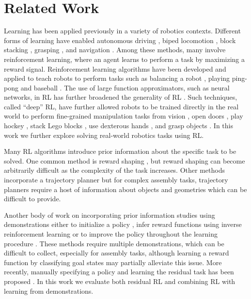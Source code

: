 \section{Related Work}\label{sec:relatedwork}

Learning has been applied previously in a variety of robotics contexts. Different forms of learning have enabled autonomous driving \cite{pomerleau1989alvinn}, biped locomotion \cite{nakanishi2004bipedlfd}, block stacking \cite{deisenroth2011stacking}, grasping \cite{pinto2015supersizing}, and navigation \cite{giusti15trails, pathak2018zeroshot}. Among these methods, many involve reinforcement learning, where an agent learns to perform a task by maximizing a reward signal. Reinforcement learning algorithms have been developed and applied to teach robots to perform tasks such as balancing a robot \cite{deisenroth2011pilco}, playing ping-pong \cite{peters2010reps} and baseball \cite{peters2008baseball}.
The use of large function approximators, such as neural networks, in RL has further broadened the generality of RL \cite{mnih2013atari}. Such techniques, called ``deep'' RL, have further allowed robots to be trained directly in the real world to perform fine-grained manipulation tasks from vision \cite{levine2016gps}, open doors \cite{gu2016naf}, play hockey \cite{chebotar2017pilqr}, stack Lego blocks \cite{zhang2019solar}, use dexterous hands \cite{zhu2019hands}, and grasp objects \cite{kalashnikov2018qtopt}. In this work we further explore solving real-world robotics tasks using RL.

Many RL algorithms introduce prior information about the specific task to be solved. One common method is reward shaping \cite{ng1999rewardshaping}, but reward shaping can become arbitrarily difficult as the complexity of the task increases. Other methods incorporate a trajectory planner \cite{thomas2018cad} but for complex assembly tasks, trajectory planners require a host of information about objects and geometries which can be difficult to provide.

Another body of work on incorporating prior information studies using  demonstrations either to initialize a policy \cite{peters2008baseball, kober2008mp}, infer reward functions using inverse reinforcement learning \cite{finn16guidedcostlearning, ziebart2008maxent} or to improve the policy throughout the learning procedure \cite{hester17dqfd, nair2018demonstrations, rajeswaran2018dextrous}. These methods require multiple demonstrations, which can be difficult to collect, especially for assembly tasks, although learning a reward function by classifying goal states \cite{singh2019raq} may partially alleviate this issue. More recently, manually specifying a policy and learning the residual task has been proposed \cite{johannink18residualrl, silver18residualpolicylearning}. In this work we evaluate both residual RL and combining RL with learning from demonstrations.

